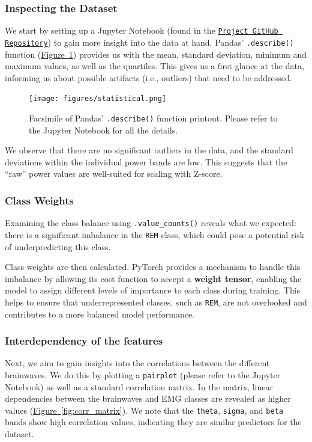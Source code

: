 \documentclass{article}
\begin{document}
\begin{multicols}{2}
\subsubsection*{Inspecting the Dataset}
We start by setting up a Jupyter Notebook (found in the \href{https://github.com/EOH-ML/FYS-STK3155-Projects/tree/main/project3}{\texttt{Project GitHub Repository}}) to gain more insight into the data at hand. Pandas' \texttt{.describe()} function \cite{mckinney_data_2010} (\hyperref[fig:statistic]{Figure~\ref*{fig:statistic}}) provides us with the mean, standard deviation, minimum and maximum values, as well as the quartiles. This gives us a first glance at the data, informing us about possible artifacts (i.e., outliers) that need to be addressed.
\begin{figure}[H]
    \centering
    \texttt{[image: figures/statistical.png]} 
    \caption{Facsimile of Pandas' \texttt{.describe()} function printout. Please refer to the Jupyter Notebook for all the details.}
    \label{fig:statistic}
\end{figure}

We observe that there are no significant outliers in the data, and the standard deviations within the individual power bands are low. This suggests that the ``raw'' power values are well-suited for scaling with Z-score.

\subsubsection*{Class Weights}
Examining the class balance using \texttt{.value\_counts()} \cite{mckinney_data_2010} reveals what we expected: there is a significant imbalance in the \texttt{REM} class, which could pose a potential risk of underpredicting this class.

Class weights are then calculated. PyTorch provides a mechanism to handle this imbalance by allowing its cost function to accept a \textbf{weight tensor}, enabling the model to assign different levels of importance to each class during training. This helps to ensure that underrepresented classes, such as \texttt{REM}, are not overlooked and contributes to a more balanced model performance.

\subsubsection*{Interdependency of the features}
Next, we aim to gain insights into the correlations between the different brainwaves. We do this by plotting a \texttt{pairplot} (please refer to the Jupyter Notebook) \cite{waskom_seaborn_2021} as well as a standard correlation matrix. In the matrix, linear dependencies between the brainwaves and EMG classes are revealed as higher values (\hyperref[fig:corr_matrix]{Figure~\ref*{fig:corr_matrix}}). We note that the \texttt{theta}, \texttt{sigma}, and \texttt{beta} bands show high correlation values, indicating they are similar predictors for the dataset.


\end{multicols}
\end{document}
